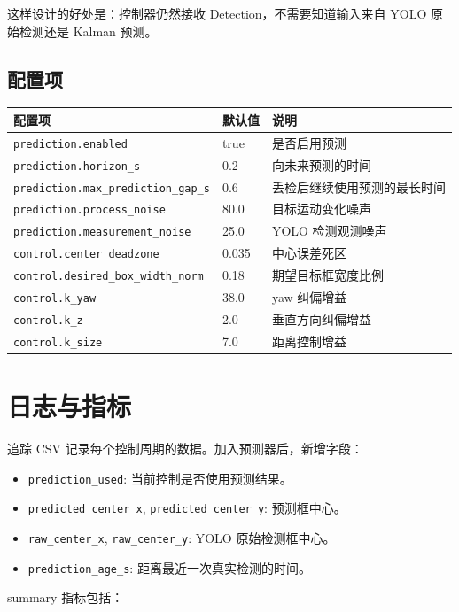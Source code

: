 \documentclass[UTF8,a4paper,11pt]{ctexart}
\begin{document}
这样设计的好处是：控制器仍然接收 Detection，不需要知道输入来自 YOLO 原始检测还是 Kalman 预测。

\subsection{配置项}

\begin{longtable}{>{\raggedright\arraybackslash}p{4cm}p{3cm}p{7cm}}
\toprule
配置项 & 默认值 & 说明 \\
\midrule
\texttt{prediction.enabled} & true & 是否启用预测 \\
\texttt{prediction.horizon\_s} & 0.2 & 向未来预测的时间 \\
\texttt{prediction.max\_prediction\_gap\_s} & 0.6 & 丢检后继续使用预测的最长时间 \\
\texttt{prediction.process\_noise} & 80.0 & 目标运动变化噪声 \\
\texttt{prediction.measurement\_noise} & 25.0 & YOLO 检测观测噪声 \\
\texttt{control.center\_deadzone} & 0.035 & 中心误差死区 \\
\texttt{control.desired\_box\_width\_norm} & 0.18 & 期望目标框宽度比例 \\
\texttt{control.k\_yaw} & 38.0 & yaw 纠偏增益 \\
\texttt{control.k\_z} & 2.0 & 垂直方向纠偏增益 \\
\texttt{control.k\_size} & 7.0 & 距离控制增益 \\
\bottomrule
\end{longtable}

\section{日志与指标}

追踪 CSV 记录每个控制周期的数据。加入预测器后，新增字段：

\begin{itemize}
  \item \texttt{prediction\_used}: 当前控制是否使用预测结果。
  \item \texttt{predicted\_center\_x}, \texttt{predicted\_center\_y}: 预测框中心。
  \item \texttt{raw\_center\_x}, \texttt{raw\_center\_y}: YOLO 原始检测框中心。
  \item \texttt{prediction\_age\_s}: 距离最近一次真实检测的时间。
\end{itemize}

summary 指标包括：
\end{document}
